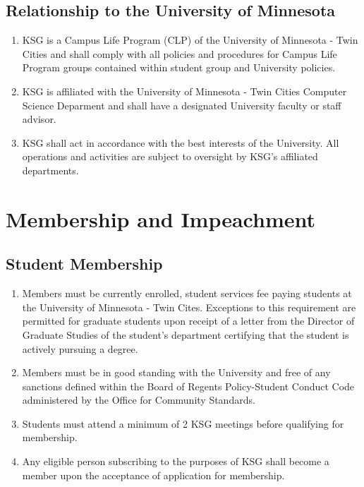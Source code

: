 \documentclass[12pt,executivepaper]{article}
\begin{document}
\subsection{Relationship to the University of Minnesota}
\begin{enumerate}
    \item KSG is a Campus Life Program (CLP) of the University of Minnesota -
          Twin Cities and shall comply with all policies and procedures for
          Campus Life Program groups contained within student group and
          University policies.
    \item KSG is affiliated with the University of Minnesota - Twin Cities
          Computer Science Deparment and shall have a designated University
          faculty or staff advisor.
    \item KSG shall act in accordance with the best interests of the
          University. All operations and activities are subject to oversight
          by KSG's affiliated departments.
\end{enumerate}

\section{Membership and Impeachment}

\subsection{Student Membership}
\begin{enumerate}
    \item Members must be currently enrolled, student services fee paying students at the
          University of Minnesota - Twin Cites. Exceptions to this requirement are permitted
          for graduate students upon receipt of a letter from the Director of Graduate Studies
          of the student's department certifying that the student is actively pursuing a degree.
    \item Members must be in good standing with the University and free of any sanctions defined
          within the Board of Regents Policy-Student Conduct Code administered by the Office
          for Community Standards.
    \item Students must attend a minimum of 2 KSG meetings before qualifying for
          membership.
    \item Any eligible person subscribing to the purposes of KSG shall become a
          member upon the acceptance of application for membership.
\end{enumerate}
\end{document}
